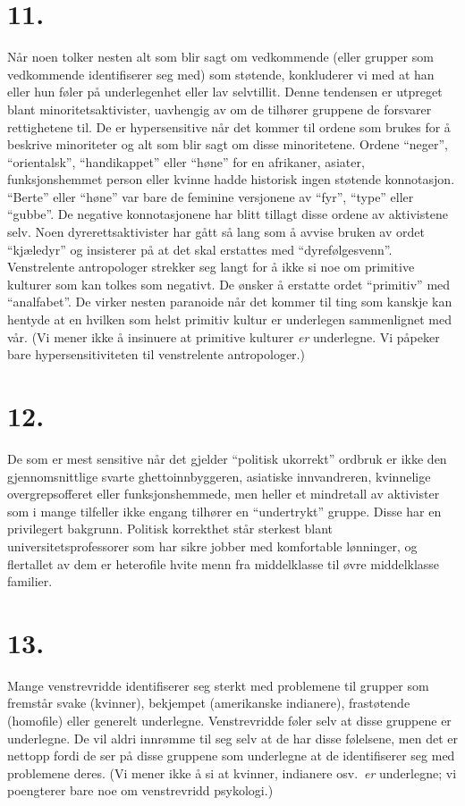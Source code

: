 \documentclass[oneside]{book}
\begin{document}
\section*{11.}
Når noen tolker nesten alt som blir sagt om vedkommende (eller grupper som
vedkommende identifiserer seg med) som støtende, konkluderer vi med at han
eller hun føler på underlegenhet eller lav selvtillit. Denne tendensen er
utpreget blant minoritetsaktivister, uavhengig av om de tilhører gruppene de
forsvarer rettighetene til. De er hypersensitive når det kommer til ordene som
brukes for å beskrive minoriteter og alt som blir sagt om disse minoritetene.
Ordene ``neger'', ``orientalsk'', ``handikappet'' eller ``høne'' for en
afrikaner, asiater, funksjonshemmet person eller kvinne hadde historisk ingen
støtende konnotasjon. ``Berte'' eller ``høne'' var bare de feminine versjonene
av ``fyr'', ``type'' eller ``gubbe''. De negative konnotasjonene har blitt
tillagt disse ordene av aktivistene selv. Noen dyrerettsaktivister har gått så
lang som å avvise bruken av ordet ``kjæledyr'' og insisterer på at det skal
erstattes med ``dyrefølgesvenn''. Venstrelente antropologer strekker seg langt
for å ikke si noe om primitive kulturer som kan tolkes som negativt. De ønsker
å erstatte ordet ``primitiv'' med ``analfabet''. De virker nesten paranoide når
det kommer til ting som kanskje kan hentyde at en hvilken som helst primitiv
kultur er underlegen sammenlignet med vår. (Vi mener ikke å insinuere at
primitive kulturer \emph{er} underlegne. Vi påpeker bare hypersensitiviteten til
venstrelente antropologer.)

\section*{12.}
De som er mest sensitive når det gjelder ``politisk ukorrekt'' ordbruk er ikke
den gjennomsnittlige svarte ghettoinnbyggeren, asiatiske innvandreren,
kvinnelige overgrepsofferet eller funksjonshemmede, men heller et mindretall av
aktivister som i mange tilfeller ikke engang tilhører en ``undertrykt'' gruppe.
Disse har en privilegert bakgrunn. Politisk korrekthet står sterkest blant
universitetsprofessorer som har sikre jobber med komfortable lønninger, og
flertallet av dem er heterofile hvite menn fra middelklasse til øvre
middelklasse familier.

\section*{13.}
Mange venstrevridde identifiserer seg sterkt med problemene til grupper som
fremstår svake (kvinner), bekjempet (amerikanske indianere), frastøtende
(homofile) eller generelt underlegne. Venstrevridde føler selv at disse
gruppene er underlegne. De vil aldri innrømme til seg selv at de har disse
følelsene, men det er nettopp fordi de ser på disse gruppene som underlegne at
de identifiserer seg med problemene deres. (Vi mener ikke å si at kvinner,
indianere osv.\ \emph{er} underlegne; vi poengterer bare noe om venstrevridd
psykologi.)
\end{document}
